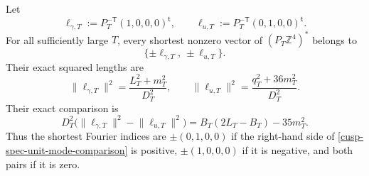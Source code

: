 \begin{theorem}
\label{cusp-spec-shortest-modes}
Let
\begin{equation}
 \ell_{\gamma,T}:=P_T^{-\mathsf T}(1,0,0,0)^{\mathsf t},
 \qquad
 \ell_{u,T}:=P_T^{-\mathsf T}(0,1,0,0)^{\mathsf t}.
 \label{cusp-spec-unit-dual-modes}
\end{equation}
For all sufficiently large \(T\), every shortest nonzero vector of
\((P_T\mathbb Z^4)^*\) belongs to
\[
 \{\pm\ell_{\gamma,T},\ \pm\ell_{u,T}\}.
\]
Their exact squared lengths are
\begin{equation}
 \lVert\ell_{\gamma,T}\rVert^2
 =\frac{L_T^2+m_T^2}{D_T^2},
 \qquad
 \lVert\ell_{u,T}\rVert^2
 =\frac{q_T^2+36m_T^2}{D_T^2}.
 \label{cusp-spec-unit-mode-exact-lengths}
\end{equation}
Their exact comparison is
\begin{equation}
 D_T^2\bigl(\lVert\ell_{\gamma,T}\rVert^2
              -\lVert\ell_{u,T}\rVert^2\bigr)
 =B_T(2L_T-B_T)-35m_T^2.
 \label{cusp-spec-unit-mode-comparison}
\end{equation}
Thus the shortest Fourier indices are \(\pm(0,1,0,0)\) if the right-hand
side of \cref{cusp-spec-unit-mode-comparison} is positive,
\(\pm(1,0,0,0)\) if it is negative, and both pairs if it is zero.


\end{theorem}
